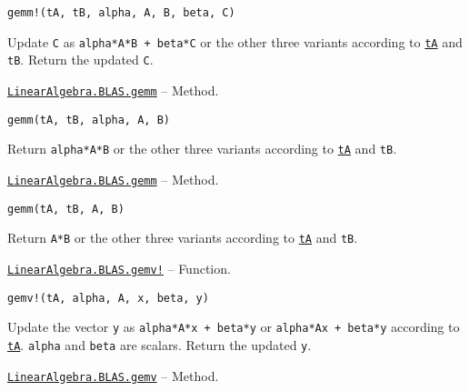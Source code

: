 \begin{adjustwidth}{2em}{0pt}


\begin{verbatim}
gemm!(tA, tB, alpha, A, B, beta, C)
\end{verbatim}

Update \texttt{C} as \texttt{alpha*A*B + beta*C} or the other three variants according to \hyperlink{15951037910221396131}{\texttt{tA}} and \texttt{tB}. Return the updated \texttt{C}.



\end{adjustwidth}
\hypertarget{12935993568670314935}{} 
\hyperlink{12935993568670314935}{\texttt{LinearAlgebra.BLAS.gemm}}  -- {Method.}

\begin{adjustwidth}{2em}{0pt}


\begin{verbatim}
gemm(tA, tB, alpha, A, B)
\end{verbatim}

Return \texttt{alpha*A*B} or the other three variants according to \hyperlink{15951037910221396131}{\texttt{tA}} and \texttt{tB}.



\end{adjustwidth}
\hypertarget{10789182689496100432}{} 
\hyperlink{10789182689496100432}{\texttt{LinearAlgebra.BLAS.gemm}}  -- {Method.}

\begin{adjustwidth}{2em}{0pt}


\begin{verbatim}
gemm(tA, tB, A, B)
\end{verbatim}

Return \texttt{A*B} or the other three variants according to \hyperlink{15951037910221396131}{\texttt{tA}} and \texttt{tB}.



\end{adjustwidth}
\hypertarget{11474194682797565787}{} 
\hyperlink{11474194682797565787}{\texttt{LinearAlgebra.BLAS.gemv!}}  -- {Function.}

\begin{adjustwidth}{2em}{0pt}


\begin{verbatim}
gemv!(tA, alpha, A, x, beta, y)
\end{verbatim}

Update the vector \texttt{y} as \texttt{alpha*A*x + beta*y} or \texttt{alpha*A{\textquotesingle}x + beta*y} according to \hyperlink{15951037910221396131}{\texttt{tA}}. \texttt{alpha} and \texttt{beta} are scalars. Return the updated \texttt{y}.



\end{adjustwidth}
\hypertarget{1491593334980744629}{} 
\hyperlink{1491593334980744629}{\texttt{LinearAlgebra.BLAS.gemv}}  -- {Method.}

